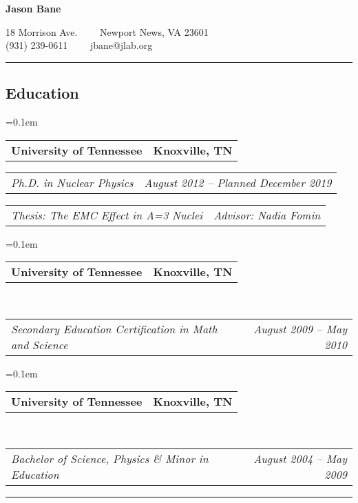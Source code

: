 \documentclass[12pt,letterpaper]{article}
\makeatletter
\newcommand{\headerrow}[2]
{\begin{tabular*}{\linewidth}{l@{\extracolsep{\fill}}r}
	#1 &
	#2 \\
\end{tabular*}}
\makeatother
\begin{document}
	
\begin{center}
{\LARGE \textbf{Jason Bane}}

18 Morrison Ave.\ \ \textbullet
\ \ Newport News, VA 23601 \\
(931) 239-0611\ \ \textbullet
\ \ jbane@jlab.org
\end{center}

\hrule
\vspace{-0.4em}
\subsection*{Education}

\begin{itemize*}
	\parskip=0.1em
	
	\item 
	\headerrow
	{\textbf{University of Tennessee}}
	{\textbf{Knoxville, TN}}
	
	\headerrow
	{\emph{Ph.D. in Nuclear Physics}}
	{\emph{August 2012 -- Planned December 2019}}
		\headerrow
	{\emph{Thesis: The EMC Effect in A=3 Nuclei}}
	{\emph{Advisor: Nadia Fomin}}
	
	
	\parskip=0.1em
	
	\item 
	\headerrow
	{\textbf{University of Tennessee}}
	{\textbf{Knoxville, TN}}
	\\
	\headerrow
	{\emph{Secondary Education Certification in Math and Science}}
	{\emph{August 2009 -- May 2010}}
	
	
	\parskip=0.1em
	
	\item 
	\headerrow
	{\textbf{University of Tennessee}}
	{\textbf{Knoxville, TN}}
	\\
	\headerrow
	{\emph{Bachelor of Science, Physics \& Minor in Education }}
	{\emph{August 2004 -- May 2009}}
	
	
\end{itemize*}
\hrule
\vspace{-0.4em}
\end{document}
